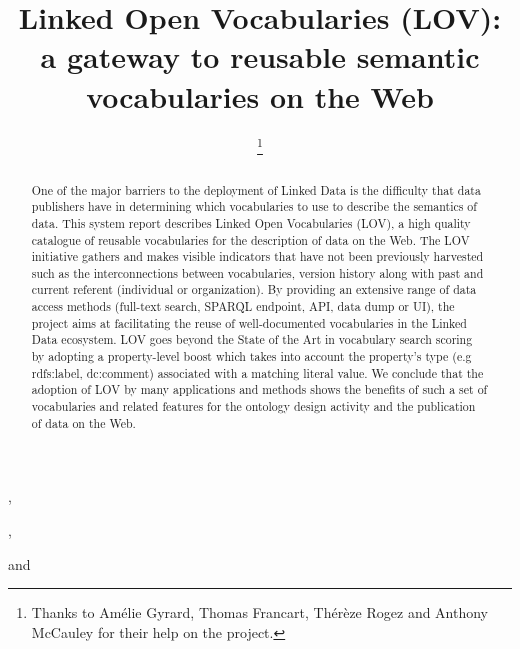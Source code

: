 \documentclass{iosart2c}
\begin{document}
\begin{frontmatter}                        %

%
\title{Linked Open Vocabularies (LOV): a gateway to reusable semantic vocabularies on the Web}




\author[A]{ \thanks{Thanks to Am\'elie Gyrard, Thomas Francart, Th\'er\`{e}ze Rogez and Anthony McCauley for their help on the project.}},
\author[B]{ },
\author[C]{ }
and
\author[D]{ }
\address[A]{Fujitsu (Ireland) Limited, Swords, Co. Dublin, Ireland\\
E-mail: pierre-yves.vandenbussche@ie.fujitsu.com}
\address[B]{Mondeca, 35 boulevard de Strasbourg, 75010 Paris, France\\
E-mail: ghislain.atemezing@mondeca.com}
\address[C]{Ontology Engineering Group (OEG), 
Universidad Polit\'ecnica de Madrid, Madrid, Spain\\
E-mail: mpoveda@fi.upm.es}
\address[D]{Mondeca, 35 boulevard de Strasbourg, 75010 Paris, France
\\
E-mail: bernard.vatant@mondeca.com}


\begin{abstract}
One of the major barriers to the deployment of Linked Data is the difficulty that data publishers have in determining which vocabularies to use to describe the semantics of data. This system report describes Linked Open Vocabularies (LOV), a high quality catalogue of reusable vocabularies for the description of data on the Web. The LOV initiative gathers and makes visible indicators that have not been previously harvested such as the interconnections between vocabularies, version history along with past and current referent (individual or organization). By providing an extensive range of data access methods (full-text search, SPARQL endpoint, API, data dump or UI), the project aims at facilitating the reuse of well-documented vocabularies in the Linked Data ecosystem. LOV goes beyond the State of the Art in vocabulary search scoring by adopting a property-level boost which takes into account the property's type (e.g rdfs:label, dc:comment) associated with a matching literal value. We conclude that the adoption of LOV by many applications and methods shows the benefits of such a set of vocabularies and related features for the ontology design activity and the publication of data on the Web.
\end{abstract}


\end{frontmatter}
\end{document}
